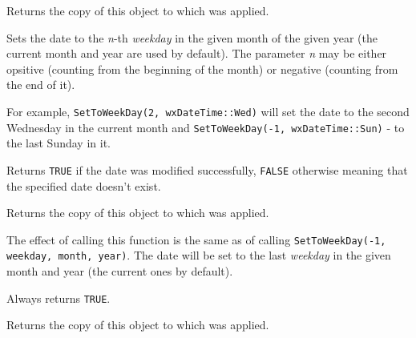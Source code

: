 
Returns the copy of this object to which
 was applied.

\label{wxdatetimesettoweekday}


Sets the date to the {\it n}-th {\it weekday} in the given month of the given
year (the current month and year are used by default). The parameter {\it n}
may be either opsitive (counting from the beginning of the month) or negative
(counting from the end of it).

For example, {\tt SetToWeekDay(2, wxDateTime::Wed)} will set the date to the
second Wednesday in the current month and
{\tt SetToWeekDay(-1, wxDateTime::Sun)} - to the last Sunday in it.

Returns {\tt TRUE} if the date was modified successfully, {\tt FALSE}
otherwise meaning that the specified date doesn't exist.

\label{wxdatetimegetweekday2}


Returns the copy of this object to which
 was applied.

\label{wxdatetimesettolastweekday}


The effect of calling this function is the same as of calling
{\tt SetToWeekDay(-1, weekday, month, year)}. The date will be set to the last
{\it weekday} in the given month and year (the current ones by default).

Always returns {\tt TRUE}.

\label{wxdatetimegetlastweekday}


Returns the copy of this object to which
 was applied.

